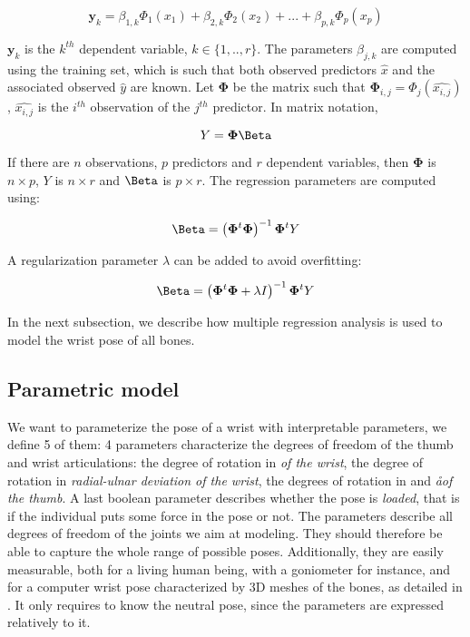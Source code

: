 \begin{equation}
	\mathbf{y}_k = \beta_{1,k} \Phi_1(x_{1}) + \beta_{2,k} \Phi_2(x_{2}) + ... + \beta_{p,k} \Phi_p(x_{p})
\end{equation}

$\mathbf{y}_k$ is the $k^{th}$ dependent variable, $k\in \{1,..,r\}$. 
The parameters $\beta_{j,k}$ are computed using the training set, which is such that both observed predictors $\widehat{x}$ and the associated observed $\widehat{y}$ are known. Let $\mathbf{\Phi}$ be the matrix such that $\mathbf{\Phi}_{i,j} = \Phi_j(\widehat{x_{i,j}})$, $\widehat{x_{i,j}}$ is the $i^{th}$ observation of the $j^{th}$ predictor. In matrix notation, 

\begin{equation}
	Y = \mathbf{\Phi} \Beta
\end{equation}

If there are $n$ observations, $p$ predictors and $r$ dependent variables, then $\mathbf{\Phi}$ is $n\times p$, $Y$ is $n\times r$ and $\Beta$ is $p\times r$.
The regression parameters are computed using: 

\begin{equation}
	\Beta = \left( \mathbf{\Phi}^t \mathbf{\Phi}\right)^{-1} \mathbf{\Phi}^t Y
	\label{eq:regression_computation}
\end{equation}

A regularization parameter $\lambda$ can be added to avoid overfitting: 

\begin{equation}
	\Beta = \left( \mathbf{\Phi}^t \mathbf{\Phi} + \lambda I\right)^{-1} \mathbf{\Phi}^t Y
	\label{eq:regression_regularization}
\end{equation}

In the next subsection, we describe how multiple regression analysis is used to model the wrist pose of all bones. 

\subsection{Parametric model}
\label{ssec:parametric_model}

We want to parameterize the pose of a wrist with interpretable parameters, we define 5 of them: 4 parameters characterize the degrees of freedom of the thumb and wrist articulations: the degree of rotation in \textit{\fe* of the wrist}, the degree of rotation in \textit{radial-ulnar deviation of the wrist}, the degrees of rotation in \textit{\fe*} and \textit{\aa* of the thumb}. A last boolean parameter describes whether the pose is \textit{loaded}, that is if the individual puts some force in the pose or not. The parameters describe all degrees of freedom of the joints we aim at modeling. They should therefore be able to capture the whole range of possible poses. Additionally, they are easily measurable, both for a living human being, with a goniometer for instance, and for a computer wrist pose characterized by 3D meshes of the bones, as detailed in . It only requires to know the neutral pose, since the parameters are expressed relatively to it.


